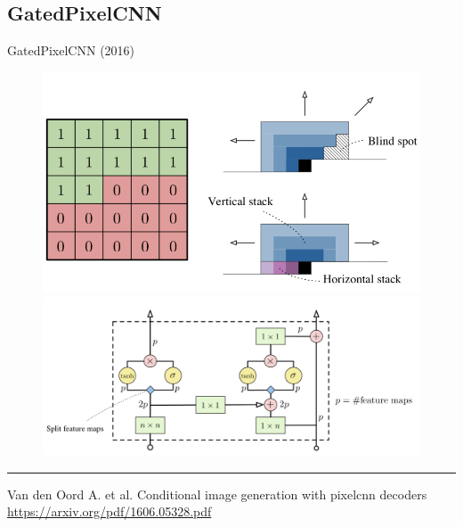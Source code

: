 \subsection{GatedPixelCNN}
\begin{frame}{GatedPixelCNN (2016)}
\begin{figure}
	\centering
	\includegraphics[width=0.5\linewidth]{figs/gatedpixelcnn.png}
	\includegraphics[width=0.5\linewidth]{figs/gated_block.png}
\end{figure}
\vfill
\hrule\medskip
{\scriptsize Van den Oord A. et al. Conditional image generation with pixelcnn decoders \href{https://arxiv.org/pdf/1606.05328.pdf}{https://arxiv.org/pdf/1606.05328.pdf}}
\end{frame}
